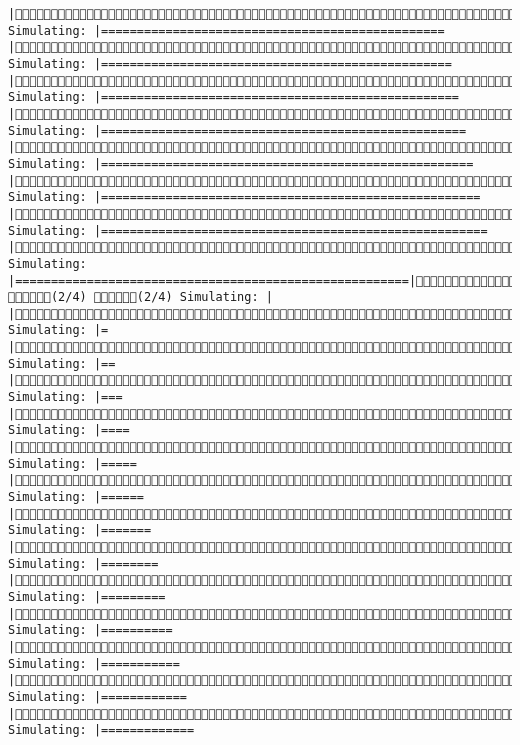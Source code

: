\documentclass[]{article}
\begin{document}
\begin{verbatim}
|(1/4) Simulating: |================================================       |(1/4) Simulating: |=================================================      |(1/4) Simulating: |==================================================     |(1/4) Simulating: |===================================================    |(1/4) Simulating: |====================================================   |(1/4) Simulating: |=====================================================  |(1/4) Simulating: |====================================================== |(1/4) Simulating: |=======================================================|(1/4) (2/4) (2/4) Simulating: |                                                       |(2/4) Simulating: |=                                                      |(2/4) Simulating: |==                                                     |(2/4) Simulating: |===                                                    |(2/4) Simulating: |====                                                   |(2/4) Simulating: |=====                                                  |(2/4) Simulating: |======                                                 |(2/4) Simulating: |=======                                                |(2/4) Simulating: |========                                               |(2/4) Simulating: |=========                                              |(2/4) Simulating: |==========                                             |(2/4) Simulating: |===========                                            |(2/4) Simulating: |============                                           |(2/4) Simulating: |=============                                     
\end{verbatim}
\end{document}
